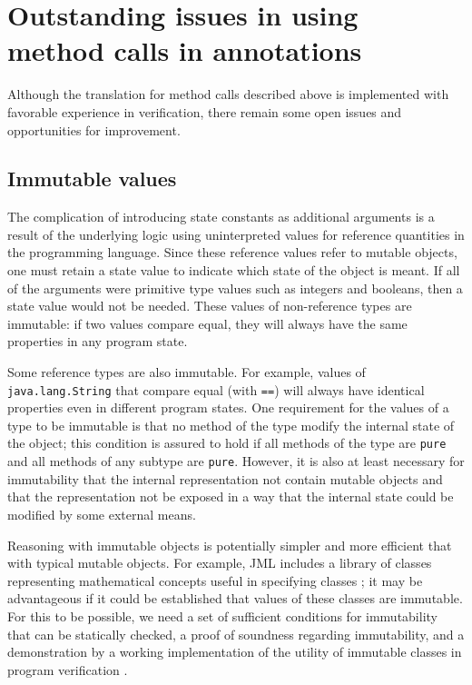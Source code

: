 \documentclass{sig-alternate}
\begin{document}
\section{Outstanding issues in using \\ method calls in annotations}

Although the translation for method calls described above is implemented with 
favorable experience in verification, there remain some open issues and opportunities 
for improvement.

\subsection{Immutable values}

The complication of introducing state constants as additional arguments is a result of the underlying logic using uninterpreted values for reference quantities in the programming language.
Since these reference values refer to mutable objects, one must retain a state value to 
indicate which state of the object is meant.  If all of the arguments were primitive type values
such as integers and booleans, then a state value would not be needed.  These values of
non-reference types are immutable: if two values compare equal, they will always have the same
properties in any program state. 

Some reference types are also immutable.  For example, values of \texttt{java.lang.String} that
compare equal (with \texttt{==}) will always have identical properties even in different program
states.  One requirement for the values of a type to be immutable is that no method of the type
modify the internal state of the object; this condition is assured to hold if all methods of the type are
\texttt{pure} and all methods of any subtype are \texttt{pure}.  However, it is also at least
necessary for immutability
that the internal representation not contain mutable objects and
that the representation not be exposed  in a way that the internal state could be modified by 
some external means.

Reasoning with immutable objects is potentially simpler and more efficient that with typical
mutable objects.  For example, JML includes a library of classes representing mathematical 
concepts useful in specifying classes \cite{Leavens-etal03a}; 
it may be advantageous if it could be 
established that values of these classes are immutable.  For this to be possible, we need 
a set of sufficient conditions for immutability that can be statically checked, a proof of 
soundness regarding immutability, and a demonstration by a working implementation
of the utility of immutable classes in program verification .
\end{document}
